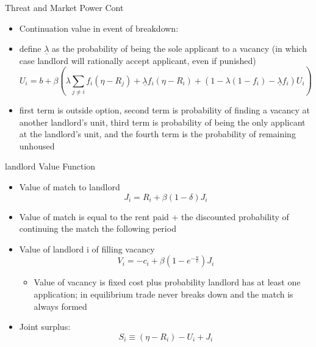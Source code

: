 \documentclass[10pt, xcolor=dvipsnames]{beamer}
\begin{document}
\begin{frame}{Threat and Market Power Cont}
    \begin{itemize}
         \item Continuation value in event of breakdown:
        \item define \textbf{$\underline{\lambda}$} as the probability of being the sole applicant to a vacancy (in which case landlord will rationally accept applicant, even if punished)
        \begin{equation}\label{eq:match-val}
            U_i = b + \beta \left(\lambda\sum_{j\neq i}f_i(\eta - R_j) + \underline{\lambda} f_i(\eta - R_i) + (1-\lambda(1-f_i) - \underline{\lambda} f_i)U_i\right)
        \end{equation}
        \item first term is outside option, second term is probability of finding a vacancy at another landlord's unit, third term is probability of being the only applicant at the landlord's unit, and the fourth term is the probability of remaining unhoused
    \end{itemize}
\end{frame}

\begin{frame}{landlord Value Function}
    \begin{itemize}
    \item Value of match to landlord \begin{equation}
        J_i = R_i + \beta(1 - \delta)J_i
    \end{equation} 
    \item Value of match is equal to the rent paid + the discounted probability of continuing the match the following period 
    \item Value of landlord i of filling vacancy \begin{equation}\label{eq:job-value}
        V_i = -c_i + \beta(1  - e^{-\frac{u}{v}})J_i
    \end{equation}
    \begin{itemize}
        \item Value of vacancy is fixed cost plus probability landlord has at least one application; in equilibrium trade never breaks down and the match is always formed 
    \end{itemize}
    \item Joint surplus: \begin{equation}\label{eq:surplus-value}
        S_i \equiv (\eta - R_i) - U_i + J_i
    \end{equation}
    \end{itemize}
\end{frame}
\end{document}
